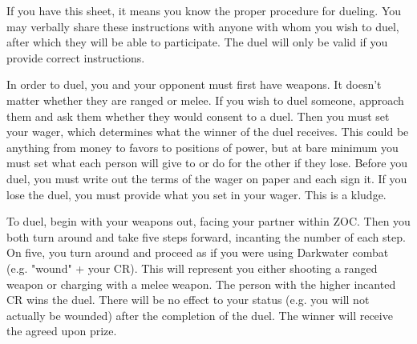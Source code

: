 \documentclass[green]{guildcamp4}
\begin{document}
\name{\gDuel{}}

If you have this sheet, it means you know the proper procedure for dueling. You may verbally share these instructions with anyone with whom you wish to duel, after which they will be able to participate. The duel will only be valid if you provide correct instructions.

In order to duel, you and your opponent must first have weapons. It doesn't matter whether they are ranged or melee. If you wish to duel someone, approach them and ask them whether they would consent to a duel. Then you must set your wager, which determines what the winner of the duel receives. This could be anything from money to favors to positions of power, but at bare minimum you must set what each person will give to or do for the other if they lose. Before you duel, you must write out the terms of the wager on paper and each sign it. If you lose the duel, you must provide what you set in your wager. This is a kludge.

To duel, begin with your weapons out, facing your partner within ZOC. Then you both turn around and take five steps forward, incanting the number of each step. On five, you turn around and proceed as if you were using Darkwater combat (e.g. "wound" + your CR). This will represent you either shooting a ranged weapon or charging with a melee weapon. The person with the higher incanted CR wins the duel. There will be no effect to your status (e.g. you will not actually be wounded) after the completion of the duel. The winner will receive the agreed upon prize.
\end{document}
